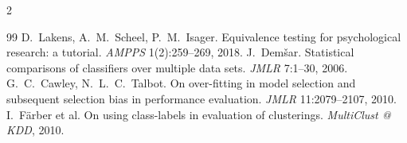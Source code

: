 \begin{multicols}{2}
\begin{thebibliography}{99}
 D.~Lakens, A.~M.~Scheel, P.~M.~Isager. Equivalence testing for psychological research: a tutorial. \emph{AMPPS} 1(2):259--269, 2018.
 J.~Dem\v{s}ar. Statistical comparisons of classifiers over multiple data sets. \emph{JMLR} 7:1--30, 2006.
 G.~C.~Cawley, N.~L.~C.~Talbot. On over-fitting in model selection and subsequent selection bias in performance evaluation. \emph{JMLR} 11:2079--2107, 2010.
 I.~F\"arber et al. On using class-labels in evaluation of clusterings. \emph{MultiClust @ KDD}, 2010.
\end{thebibliography}
\end{multicols}
\endgroup
